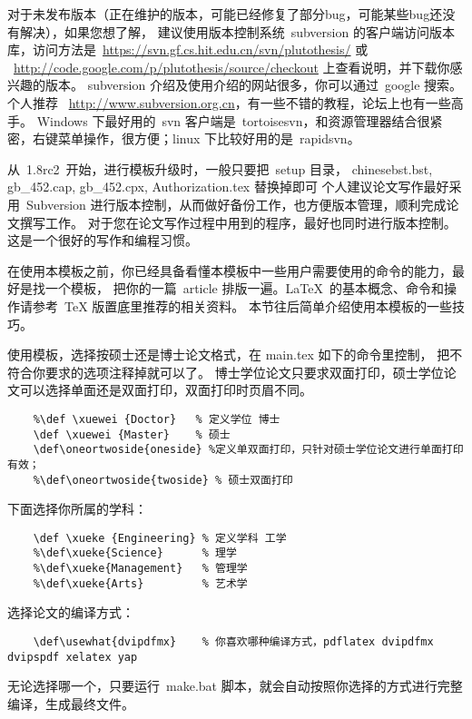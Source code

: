 对于未发布版本（正在维护的版本，可能已经修复了部分bug，可能某些bug还没有解决），如果您想了解，
建议使用版本控制系统~subversion 的客户端访问版本库，访问方法是~\url{https://svn.gf.cs.hit.edu.cn/svn/plutothesis/} 或 ~\url{http://code.google.com/p/plutothesis/source/checkout} 上查看说明，并下载你感兴趣的版本。
subversion 介绍及使用介绍的网站很多，你可以通过~google 搜索。
个人推荐~ \url{http://www.subversion.org.cn}，有一些不错的教程，论坛上也有一些高手。
Windows 下最好用的~svn 客户端是~tortoisesvn，和资源管理器结合很紧密，右键菜单操作，很方便；linux 下比较好用的是~rapidsvn。

从~1.8rc2~开始，进行模板升级时，一般只要把~setup 目录，
chinesebst.bst, gb\_452.cap, gb\_452.cpx, Authorization.tex 替换掉即可
个人建议论文写作最好采用~Subversion 进行版本控制，从而做好备份工作，也方便版本管理，顺利完成论文撰写工作。
对于您在论文写作过程中用到的程序，最好也同时进行版本控制。这是一个很好的写作和编程习惯。

\label{Tricks:Introduction}
在使用本模板之前，你已经具备看懂本模板中一些用户需要使用的命令的能力，最好是找一个模板，
把你的一篇~article 排版一遍。\LaTeX~的基本概念、命令和操作请参考~TeX 版置底里推荐的相关资料。
本节往后简单介绍使用本模板的一些技巧。


使用模板，选择按硕士还是博士论文格式，在 main.tex 如下的命令里控制， 把不符合你要求的选项注释掉就可以了。
博士学位论文只要求双面打印，硕士学位论文可以选择单面还是双面打印，双面打印时页眉不同。\vspace{-5pt}
\begin{verbatim}
    %\def \xuewei {Doctor}   % 定义学位 博士
    \def \xuewei {Master}    % 硕士
    \def\oneortwoside{oneside} %定义单双面打印，只针对硕士学位论文进行单面打印有效；
    %\def\oneortwoside{twoside} % 硕士双面打印
\end{verbatim}

下面选择你所属的学科：\vspace{-5pt}
\begin{verbatim}
    \def \xueke {Engineering} % 定义学科 工学
    %\def\xueke{Science}      % 理学
    %\def\xueke{Management}   % 管理学
    %\def\xueke{Arts}         % 艺术学
\end{verbatim}

选择论文的编译方式：\vspace{-5pt}
\begin{verbatim}
    \def\usewhat{dvipdfmx}    % 你喜欢哪种编译方式，pdflatex dvipdfmx dvipspdf xelatex yap
\end{verbatim}
无论选择哪一个，只要运行~make.bat 脚本，就会自动按照你选择的方式进行完整编译，生成最终文件。

